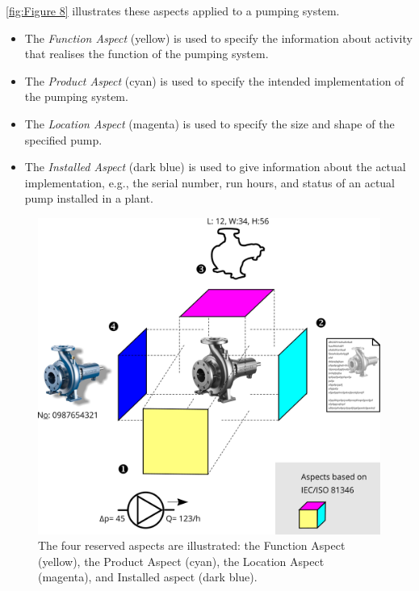 \documentclass[../main.tex]{subfiles}
\begin{document}
\autoref{fig:Figure 8} illustrates these aspects applied to a pumping system.
\begin{itemize}
  \item The \textit{Function Aspect} (yellow)  is used to specify the information about  activity that realises the function of the pumping system.
  \item The \textit{Product Aspect} (cyan)  is used to specify the intended implementation of the pumping system.
  \item The \textit{Location Aspect} (magenta)  is used to specify the %
  size and shape of the specified pump. %
  \item The \textit{Installed Aspect} (dark blue)  is used to give information about the actual implementation, e.g., the serial number, run hours, and status of an actual pump installed in a plant.
\end{itemize}

\begin{figure}[htb]
  \centering
  \includegraphics[width=.6\textwidth]{img/IMFmanual-img008.png}
  \caption[The concept of aspects.]{The four reserved aspects are illustrated: the Function Aspect (yellow), the Product Aspect (cyan), the Location Aspect (magenta), and Installed aspect (dark blue).}
  \label{fig:Figure 8}
\end{figure}


\end{document}
